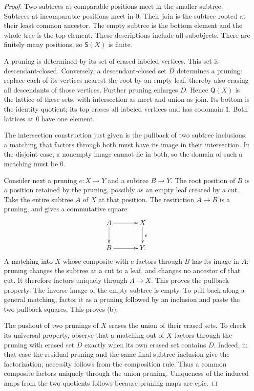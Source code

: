 \documentclass[11pt,a4paper]{article}
\theoremstyle{plain}
\theoremstyle{definition}
\theoremstyle{remark}
\begin{document}
\begin{proof}
Two subtrees at comparable positions meet in the smaller subtree.
Subtrees at incomparable positions meet in $0$. Their join is the
subtree rooted at their least common ancestor. The empty subtree
is the bottom element and the whole tree is the top element.
These descriptions include all subobjects. There are finitely many
positions, so $\mathsf S(X)$ is finite.

A pruning is determined by its set of erased labeled vertices.
This set is descendant-closed. Conversely, a descendant-closed
set $D$ determines a pruning: replace each of its vertices nearest
the root by an empty leaf, thereby also erasing all descendants
of those vertices. Further pruning enlarges $D$. Hence
$\mathsf Q(X)$ is the lattice of these sets, with intersection
as meet and union as join. Its bottom is the identity quotient;
its top erases all labeled vertices and has codomain $1$.
Both lattices at $0$ have one element.

The intersection construction just given is the pullback of two
subtree inclusions: a matching that factors through both must
have its image in their intersection. In the disjoint case, a
nonempty image cannot lie in both, so the domain of such a
matching must be $0$.

Consider next a pruning $e:X\to Y$ and a subtree $B\to Y$.
The root position of $B$ is a position retained by the pruning,
possibly as an empty leaf created by a cut. Take the entire
subtree $A$ of $X$ at that position. The restriction $A\to B$
is a pruning, and gives a commutative square
\[
\xymatrix@C=3.5em@R=2.4em{
A\ar[r]\ar[d]&X\ar[d]^e\\
B\ar[r]&Y.
}
\]
A matching into $X$ whose composite with $e$
factors through $B$ has its image in $A$: pruning changes the
subtree at a cut to a leaf, and changes no ancestor of that cut.
It therefore factors uniquely through $A\to X$. This proves
the pullback property. The inverse image of the empty subtree
is empty. To pull back along a general matching, factor it as
a pruning followed by an inclusion and paste the two pullback
squares. This proves (b).

The pushout of two prunings of $X$ erases the union of their
erased sets. To check its universal property, observe that a
matching out of $X$ factors through the pruning with erased set
$D$ exactly when its own erased set contains $D$. Indeed, in
that case the residual pruning and the same final subtree
inclusion give the factorization; necessity follows from the
composition rule. Thus a common composite factors uniquely
through the union pruning. Uniqueness of the induced maps from
the two quotients follows because pruning maps are epic.


\end{proof}
\end{document}
